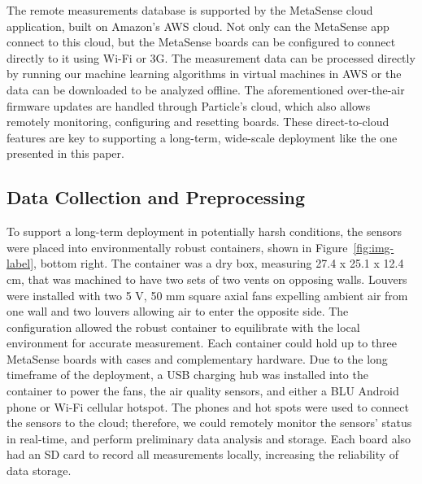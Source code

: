 \documentclass[journal abbreviation, manuscript]{copernicus}
\begin{document}

The remote measurements database is supported by the MetaSense cloud application, built on Amazon's AWS cloud.  Not only can the MetaSense app connect to this cloud, but the MetaSense boards can be configured to connect directly to it using Wi-Fi or 3G.  The measurement data can be processed directly by running our machine learning algorithms in virtual machines in AWS or the data can be downloaded to be analyzed offline.  The aforementioned over-the-air firmware updates are handled through Particle's cloud, which also allows remotely monitoring, configuring and resetting boards. These direct-to-cloud features are key to supporting a long-term, wide-scale deployment like the one presented in this paper.

\subsection{Data Collection and Preprocessing}
To support a long-term deployment in potentially harsh conditions, the sensors were placed into environmentally robust containers, shown in Figure~\ref{fig:img-label}, bottom right. The container was a dry box, measuring 27.4 x 25.1 x 12.4 cm, that was machined to have two sets of two vents on opposing walls. Louvers were installed with two 5 V, 50 mm square axial fans expelling ambient air from one wall and two louvers allowing air to enter the opposite side. The configuration allowed the robust container to equilibrate with the local environment for accurate measurement.  Each container could hold up to three MetaSense boards with cases and complementary hardware.  Due to the long timeframe of the deployment, a USB charging hub was installed into the container to power the fans, the air quality sensors, and either a BLU Android phone or Wi-Fi cellular hotspot. The phones and hot spots were used to connect the sensors to the cloud; therefore, we could remotely monitor the sensors’ status in real-time, and perform preliminary data analysis and storage. Each board also had an SD card to record all measurements locally, increasing the reliability of data storage. 
\end{document}
